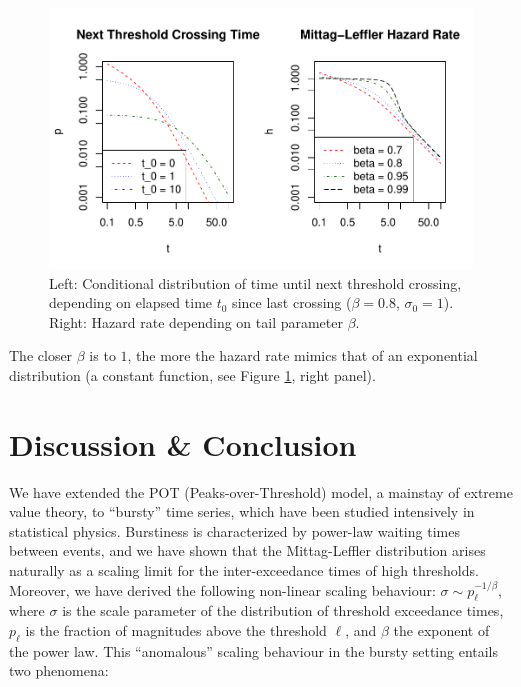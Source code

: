\documentclass[]{elsarticle} %
\begin{document}
\begin{figure}
\includegraphics[width=\textwidth]{article_springer_files/figure-latex/hazard-1} \caption{\label{fig:hazard} Left: Conditional distribution of time until next threshold crossing, depending on elapsed time $t_0$ since last crossing ($\beta = 0.8$, $\sigma_0 = 1$). Right: Hazard rate depending on tail parameter $\beta$.}\label{fig:hazard}
\end{figure}

The closer \(\beta\) is to \(1\), the more the hazard rate mimics that
of an exponential distribution (a constant function, see Figure
\ref{fig:hazard}, right panel).

\hypertarget{discussion-conclusion}{%
\section{Discussion \& Conclusion}\label{discussion-conclusion}}

We have extended the POT (Peaks-over-Threshold) model, a mainstay of
extreme value theory, to ``bursty'' time series, which have been studied
intensively in statistical physics. Burstiness is characterized by
power-law waiting times between events, and we have shown that the
Mittag-Leffler distribution arises naturally as a scaling limit for the
inter-exceedance times of high thresholds. Moreover, we have derived the
following non-linear scaling behaviour:
\(\sigma \sim p_{\ell}^{-1/\beta}\), where \(\sigma\) is the scale
parameter of the distribution of threshold exceedance times,
\(p_{\ell}\) is the fraction of magnitudes above the threshold \(\ell\),
and \(\beta\) the exponent of the power law. This ``anomalous'' scaling
behaviour in the bursty setting entails two phenomena:
\end{document}
